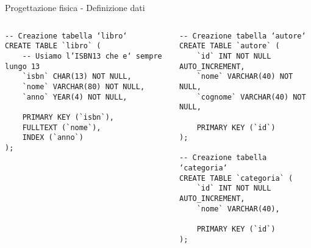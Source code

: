 \begin{frame}[fragile]{Progettazione fisica - Definizione dati}
    \begin{columns}[T]
        \begin{column}[T]{.45\textwidth}
            \begin{verbatim}
-- Creazione tabella ‘libro‘
CREATE TABLE `libro` (
    -- Usiamo l’ISBN13 che e‘ sempre lungo 13
    `isbn` CHAR(13) NOT NULL,
    `nome` VARCHAR(80) NOT NULL,
    `anno` YEAR(4) NOT NULL,

    PRIMARY KEY (`isbn`),
    FULLTEXT (`nome`),
    INDEX (`anno`)
);
            \end{verbatim}
        \end{column}
        \begin{column}[T]{.45\textwidth}
            \begin{verbatim}
-- Creazione tabella ‘autore‘
CREATE TABLE `autore` (
    `id` INT NOT NULL AUTO_INCREMENT,
    `nome` VARCHAR(40) NOT NULL,
    `cognome` VARCHAR(40) NOT NULL,

    PRIMARY KEY (`id`)
);

-- Creazione tabella ‘categoria‘
CREATE TABLE `categoria` (
    `id` INT NOT NULL AUTO_INCREMENT,
    `nome` VARCHAR(40),

    PRIMARY KEY (`id`)
);
            \end{verbatim}
        \end{column}
    \end{columns}
\end{frame}

